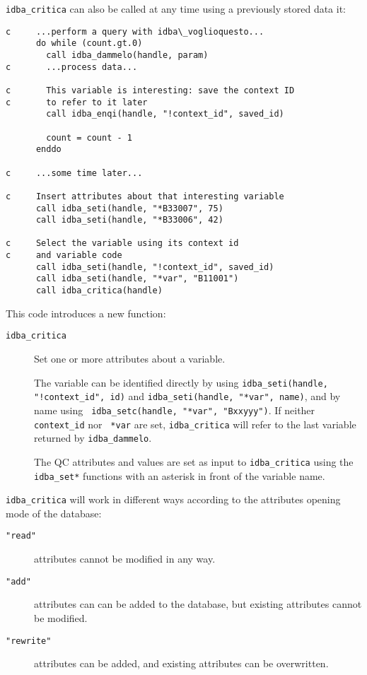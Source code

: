 \documentclass[draft,12pt,a4paper,twoside]{book}
\begin{document}
{\tt idba\_critica} can also be called at any time using a previously stored data it:

\begin{verbatim}
c     ...perform a query with idba\_voglioquesto...
      do while (count.gt.0)
        call idba_dammelo(handle, param)
c       ...process data...

c       This variable is interesting: save the context ID
c       to refer to it later
        call idba_enqi(handle, "!context_id", saved_id)
        
        count = count - 1
      enddo

c     ...some time later...

c     Insert attributes about that interesting variable
      call idba_seti(handle, "*B33007", 75)
      call idba_seti(handle, "*B33006", 42)
      
c     Select the variable using its context id
c     and variable code
      call idba_seti(handle, "!context_id", saved_id)
      call idba_seti(handle, "*var", "B11001")
      call idba_critica(handle)
\end{verbatim}

This code introduces a new function:

\begin{description}
\item[{\tt idba\_critica}]
  Set one or more attributes about a variable.
  
  The variable can be identified directly by using {\tt idba\_seti(handle, "!context\_id",
  id)} and {\tt idba\_seti(handle, "*var", name)}, and by name using {\tt
  idba\_setc(handle, "*var", "Bxxyyy")}.  If neither {\tt *context\_id} nor {\tt
  *var} are set, {\tt idba\_critica} will refer to the last variable returned
  by {\tt idba\_dammelo}.

  The QC attributes and values are set as input to {\tt idba\_critica} using the
  {\tt idba\_set*} functions with an asterisk in front of the variable name.
\end{description}


{\tt idba\_critica} will work in different ways according to the attributes
opening mode of the database:

\begin{description}
\item[{\tt "read"}] attributes cannot be modified in any way.
\item[{\tt "add"}] attributes can can be added to the database, but existing
		   attributes cannot be modified.
\item[{\tt "rewrite"}] attributes can be added, and existing attributes can be
                   overwritten.
\end{description}
\end{document}

